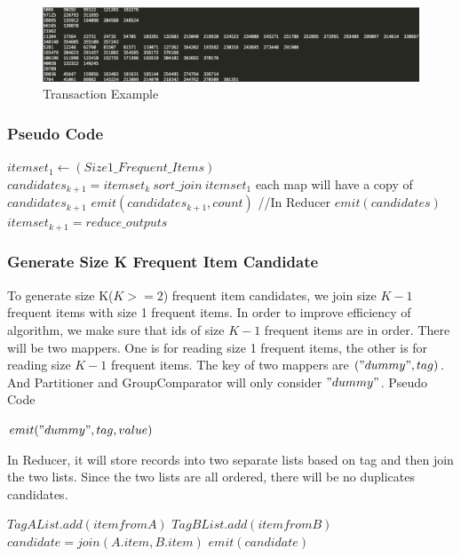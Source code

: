 \documentclass[11pt]{article} %
\begin{document}
\begin{figure}[htbp]
\begin{center}
\includegraphics[scale=0.25]{transactions.png}
\caption{Transaction Example}
\label{fig:new-format-user-song-pair}
\end{center}
\end{figure}

\subsubsection{Pseudo Code}
\begin{algorithmic}[1]
\State $itemset_1 \gets  (Size1\_Frequent\_Items)$
	\State $candidates_{k+1} = itemset_k\ sort\_join\ itemset_1$
		\State each map will have a copy of $candidates_{k+1}$
		\State $emit(candidates_{k+1},count)$
	\EndFor
	\State //In Reducer 
			$emit(candidates)$
		\EndIf
	\EndFor
	\State $itemset_{k+1} = reduce\_outputs$
\EndFor

\end{algorithmic}

\subsubsection{Generate Size K Frequent Item Candidate}
To generate size K($K>=2$) frequent item candidates, we join size $K-1$ frequent items with size 1 frequent items. In order to improve efficiency of algorithm, we make sure that ids of size $K-1$ frequent items are in order. There will be two mappers. One is for reading size 1 frequent items, the other is for reading size $K-1$ frequent items. The key of two mappers are $("dummy",tag)$. And Partitioner and GroupComparator will only consider $"dummy"$. 
Pseudo Code \\
\begin{algorithmic}[1]
\State $emit("dummy",tag,value)$
\EndFunction
\end{algorithmic}
In Reducer, it will store records into two separate lists based on tag and then join the two lists. Since the two lists are all ordered, there will be no duplicates candidates.
\begin{algorithmic}[1]
	\State $TagAList.add(item from A)$
	\State $TagBList.add(item from B)$
\EndFor
{}
		\State $candidate = join(A.item, B.item)$
		\State $emit(candidate)$
	\EndFor
\EndFor	
\EndFunction
\end{algorithmic}
\end{document}
